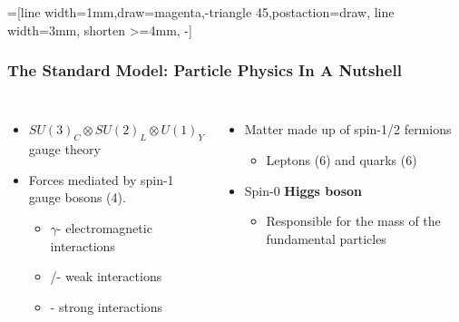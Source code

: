 \begin{frame}[fragile]
	=[line width=1mm,draw=magenta,-triangle 45,postaction={draw, line width=3mm, shorten >=4mm, -}]
	\frametitle{The Standard Model: Particle Physics In A Nutshell}
	\vspace*{-0.24cm}
	\begin{block}{}
		\begin{columns}[t,onlytextwidth]
			\vspace*{-0.20cm}
			\begin{itemize}
				\small
				\item $SU(3)_{C}{\otimes}SU(2)_{L}{\otimes}U(1)_{Y}$ gauge theory
				\item Forces mediated by spin-1 gauge bosons (4).
				\begin{itemize}
					\item $\gamma$\enspace- electromagnetic interactions
					\item \Wpm/\cPZ\enspace- weak interactions
					\item \cPg\enspace- strong interactions
				\end{itemize}
			\end{itemize}
			\begin{itemize}
				\vspace*{-0.20cm}
				\small
				\item Matter made up of spin-1/2 fermions
				\begin{itemize}
					\item Leptons (6) and quarks (6)
				\end{itemize}
				\item Spin-0 \textbf{Higgs boson}
				\begin{itemize}
					\item Responsible for the mass of the fundamental particles
				\end{itemize}
			\end{itemize}
		\end{columns}
	\end{block}
	\vspace*{-0.6cm}
	\begin{columns}[T]
		\begin{column}{0.75\textwidth}
	\begin{figure}
		\resizebox{0.82\textwidth}{!}{}
		\label{fig:standard_model}
	\end{figure}
		\end{column}

\end{columns}
\end{frame}
